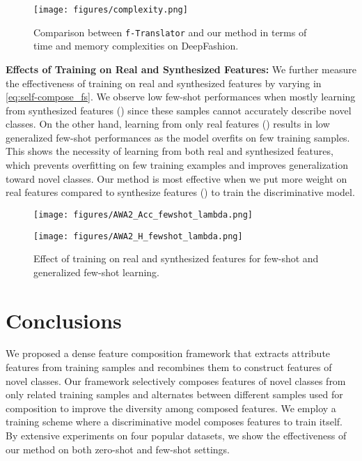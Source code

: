 \documentclass[10pt,journal,compsoc]{IEEEtran}
\newcommand{\1}{\boldsymbol{1}}
\newcommand{\0}{\boldsymbol{0}}
\newcommand{\<}{\langle}
\renewcommand{\>}{\rangle}
\newcommand{\myparagraph}[1]{\vspace{-2pt}\medskip\noindent\textbf{#1}}
\begin{document}
\begin{figure}[t!]
\centering
\texttt{[image: figures/complexity.png]}
\vspace{-0mm}
\caption{
\small{
Comparison between \texttt{f-Translator} and our method in terms of time and memory complexities on DeepFashion.
}
}
\label{fig:complexity}
\end{figure}


\myparagraph{Effects of Training on Real and Synthesized Features:}
We further measure the effectiveness of training on real and synthesized features by varying  in \eqref{eq:self-compose_fs}.
We observe low few-shot performances when mostly learning from synthesized features () since these samples cannot accurately describe novel classes.
On the other hand, learning from only real features () results in low generalized few-shot performances as the model overfits on few training samples.
This shows the necessity of learning from both real and synthesized features, which prevents overfitting on few training examples and improves generalization toward novel classes.
Our method is most effective when we put more weight on real features compared to synthesize features () to train the discriminative model.

\begin{figure}[t!]
\centering
\begin{minipage}[b]{0.45\linewidth}
  \texttt{[image: figures/AWA2\_Acc\_fewshot\_lambda.png]}
  \vspace{-1mm}
\end{minipage}
\begin{minipage}[b]{0.45\linewidth}
  \texttt{[image: figures/AWA2\_H\_fewshot\_lambda.png]}
    \vspace{-1mm}
\end{minipage}
\caption{Effect of training on real and synthesized features for few-shot and generalized few-shot learning.}
\label{fig:few_shot_performance}
\end{figure}


\section{Conclusions}
\label{sec:conclusions}
We proposed a dense feature composition framework that extracts attribute features from training samples and recombines them to construct features of novel classes. Our framework selectively composes features of novel classes from only related training samples and alternates between different samples used for composition to improve the diversity among composed features. We employ a training scheme where a discriminative model composes features to train itself. By extensive experiments on four popular datasets, we show the effectiveness of our method on both zero-shot and few-shot settings.
\end{document}
